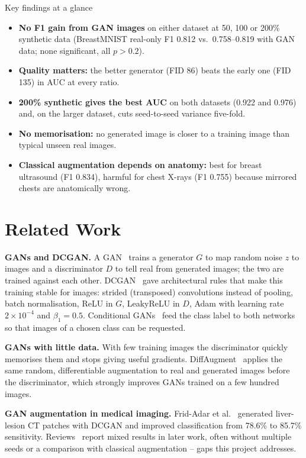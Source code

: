 \begin{keybox}{Key findings at a glance}
\begin{itemize}
  \item \textbf{No F1 gain from GAN images} on either dataset at 50, 100 or 200\% synthetic data (BreastMNIST real-only
        F1 0.812 vs.\ 0.758--0.819 with GAN data; none significant, all $p>0.2$).
  \item \textbf{Quality matters:} the better generator (FID 86) beats the early one (FID 135) in AUC at every ratio.
  \item \textbf{200\% synthetic gives the best AUC} on both datasets (0.922 and 0.976) and, on the larger dataset,
        cuts seed-to-seed variance five-fold.
  \item \textbf{No memorisation:} no generated image is closer to a training image than typical unseen real images.
  \item \textbf{Classical augmentation depends on anatomy:} best for breast ultrasound (F1 0.834), harmful for chest
        X-rays (F1 0.755) because mirrored chests are anatomically wrong.
\end{itemize}
\end{keybox}

\section{Related Work}
\textbf{GANs and DCGAN.} A GAN~\cite{goodfellow2014gan} trains a generator $G$ to map random noise $z$ to images and a
discriminator $D$ to tell real from generated images; the two are trained against each other. DCGAN~\cite{radford2016dcgan}
gave architectural rules that make this training stable for images: strided (transposed) convolutions instead of pooling,
batch normalisation, ReLU in $G$, LeakyReLU in $D$, Adam with learning rate $2\times10^{-4}$ and $\beta_1=0.5$.
Conditional GANs~\cite{mirza2014cgan} feed the class label to both networks so that images of a chosen class can be requested.

\textbf{GANs with little data.} With few training images the discriminator quickly memorises them and stops giving
useful gradients. DiffAugment~\cite{zhao2020diffaugment} applies the same random, differentiable augmentation to real and
generated images before the discriminator, which strongly improves GANs trained on a few hundred images.

\textbf{GAN augmentation in medical imaging.} Frid-Adar et al.~\cite{fridadar2018gan} generated liver-lesion CT patches
with DCGAN and improved classification from 78.6\% to 85.7\% sensitivity. Reviews~\cite{yi2019ganmedical} report
mixed results in later work, often without multiple seeds or a comparison with classical augmentation -- gaps this
project addresses.

